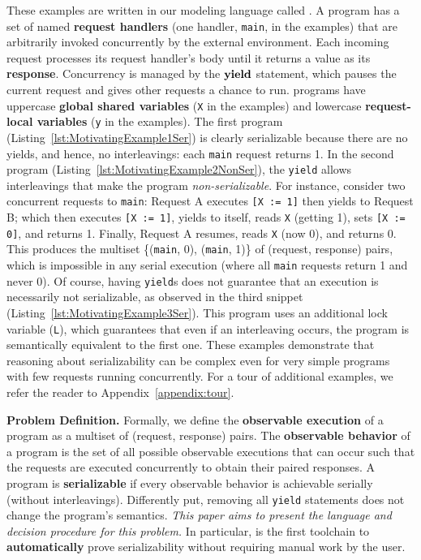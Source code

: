 These examples are written in our modeling language called \toolname.
A \toolname{} program has a set of named \textbf{request handlers} (one handler, \texttt{main}, in the examples) that are arbitrarily invoked concurrently by the external environment.
Each incoming request processes its request handler's body until it returns a value as its \textbf{response}. Concurrency is managed by the \(\textbf{yield}\)
 statement, which pauses the current request and gives other requests a chance to run. \toolname{} programs have uppercase \textbf{global shared variables} (\texttt{X} in the examples) and lowercase \textbf{request-local variables} (\texttt{y} in the examples).
%
%
%
The first program (Listing~\ref{lst:MotivatingExample1Ser}) is clearly serializable because there are no yields, and hence, no interleavings: each \texttt{main} request returns 1.
In the second program (Listing~\ref{lst:MotivatingExample2NonSer}), the \texttt{yield} allows interleavings that make the program \emph{non-serializable}. For instance, consider two concurrent requests to \texttt{main}:
Request A executes \texttt{[X := 1]} then yields to Request B; which then
executes \texttt{[X := 1]}, yields to itself, reads \texttt{X} (getting 1), sets \texttt{[X := 0]}, and returns 1.
Finally, 
Request A resumes, reads \texttt{X} (now 0), and returns 0.
This produces the multiset \{(\texttt{main}, 0), (\texttt{main}, 1)\} of (request, response) pairs, which is impossible in any serial execution (where all \texttt{main} requests return 1 and never 0).
Of course, having \texttt{yield}s does not guarantee that an execution is necessarily not serializable, as observed in the third snippet (Listing~\ref{lst:MotivatingExample3Ser}). This program uses an additional lock variable (\texttt{L}), which guarantees that even if an interleaving occurs, the program is semantically equivalent to the first one.
%
These examples demonstrate that reasoning about serializability can be complex even for very simple programs with few requests running concurrently.
%
For a tour of additional examples, we refer the reader to Appendix~\ref{appendix:tour}.

\smallskip
\noindent
\textbf{Problem Definition.}
Formally, we define the \textbf{observable execution} of a \toolname{} program as a multiset of (request, response) pairs. The \textbf{observable behavior} of a \toolname{} program is the set of all possible observable executions that can occur such that the requests are executed concurrently to obtain their paired responses.
A \toolname{} program is \textbf{serializable} if every observable behavior is achievable serially (without interleavings). Differently put, removing all \texttt{yield} statements does not change the program's semantics.
%
\emph{This paper aims to present the \toolname{} language and decision procedure for this problem.} In particular, \toolname{} is the first toolchain to \textbf{automatically} prove serializability without requiring manual work by the user.

